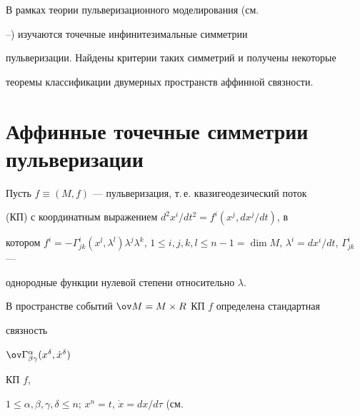  


\date{} 




\pagestyle{plain} %


 




\maketitle 


\label{begin} 


 


В рамках теории пульверизационного моделирования (см. 


\cite{1}--\cite{4}) изучаются точечные инфинитезимальные симметрии 


пульверизации. Найдены критерии таких симметрий и получены некоторые 


теоремы классификации двумерных пространств аффинной связности. 


 


\section{Аффинные точечные симметрии пульверизации} 


 


Пусть $f\equiv(M,f)$ --- пульверизация, т.\,е. квазигеодезический поток 


(КП) с координатным выражением $d^2x^i/dt^2=f^i(x^j,dx^j/dt)$, в 


котором $f^i=-\Gamma^i_{jk}(x^l,\lambda^l)\lambda^j\lambda^k$, $1\le 


i,j,k,l\le n-1=\dim M$, $\lambda^i=dx^i/dt$, $\Gamma^i_{jk}$ --- 


однородные функции нулевой степени относительно $\lambda$. 


 


В пространстве событий $\ov M=M\times R$ КП $f$ определена стандартная 


связность


$\ov\Gamma^\alpha_{\beta\gamma}(x^\delta,\Dot x^\delta)$


КП $f$, 


$1\le\alpha,\beta,\gamma,\delta\le n$; $x^n=t$, $\Dot x=dx/d\tau$ (см. 


